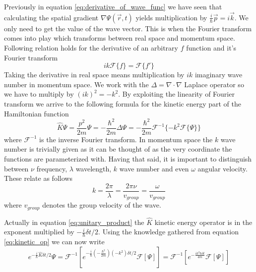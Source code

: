 Previously in equation \ref{eq:derivative_of_wave_func} we have seen that calculating the spatial gradient $\nabla \Psi(\vec{r}, t)$ yields multiplication by $\frac{i}{\hbar}\vec{p} = i\vec{k}$.
We only need to get the value of the wave vector.
This is when the Fourier transform comes into play which transforms between real space and momentum space.
Following relation holds for the derivative of an arbitrary $f$ function and it's Fourier transform
\begin{equation}
	ik\mathcal{F}\{f\} = \mathcal{F}\{f'\}
\end{equation}
Taking the derivative in real space means multiplication by $ik$ imaginary wave number in momentum space.
We work with the $\Delta = \nabla \cdot \nabla$ Laplace operator so we have to multiply by $(ik)^2 = -k^2$.
By exploiting the linearity of Fourier transform we arrive to the following formula for the kinetic energy part of the Hamiltonian function
\begin{equation}
	\label{eq:kinetic_op}
	\hat{K} \Psi = \frac{p^2}{2m}\Psi = -\frac{\hbar^2}{2m} \Delta \Psi = -\frac{\hbar^2}{2m}\mathcal{F}^{-1}
	\{
		-k^2\mathcal{F}\{\Psi\}
	\}
\end{equation}
where $\mathcal{F}^{-1}$ is the inverse Fourier transform. In momentum space the $k$ wave number is trivially given as it can be thought of as the very coordinate the functions are parameterized with.
Having that said, it is important to distinguish between $\nu$ frequency, $\lambda$ wavelength, $k$ wave number and even $\omega$ angular velocity.
These relate as follows
\begin{equation}
	\label{eq:relation_of_dimensions}
	k = \frac{2\pi}{\lambda} = \frac{2\pi\nu}{v_{group}} = \frac{\omega}{v_{group}}
\end{equation}
where $v_{group}$ denotes the group velocity of the wave.

Actually in equation \ref{eq:unitary_product} the $\hat{K}$ kinetic energy operator is in the exponent multiplied by $-\frac{i}{\hbar}\delta t / 2$.
Using the knowledge gathered from equation \ref{eq:kinetic_op} we can now write
\begin{equation}
	\label{eq:kinetic_prop}
	e^{-\frac{i}{\hbar}\hat{K}\delta t / 2}\Psi = \mathcal{F}^{-1}
	\left[
		e^{-\frac{i}{\hbar} \left(-\frac{\hbar^2}{2m}\right) \left(-k^2\right) \delta t / 2} \mathcal{F}\left[ \Psi \right]
	\right] = 
	\mathcal{F}^{-1}
	\left[
	e^{-\frac{i k^2 \hbar \delta t}{4m}} \mathcal{F}\left[ \Psi \right]
	\right]
\end{equation}

